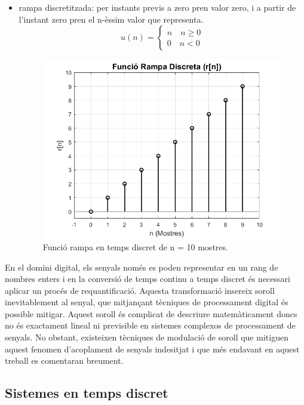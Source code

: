 \begin{itemize}
\begin{figure}[H]
        \label{step_fig}
    \end{figure}
    \item rampa discretitzada: per instants previs a zero pren valor zero, i a partir de l'instant zero pren el n-èssim valor que representa.
    \begin{equation}\label{ramp_func}
        u(n) = \left\lbrace\begin{array}{c} n\quad n \geq 0 \\ 0\quad n < 0 \end{array}\right.
    \end{equation}
    \begin{figure}[H]
        \centering
        \includegraphics[width=0.5\linewidth]{Images/imatge_rampa.png}
        \caption{Funció rampa en temps discret de n = 10 mostres.}
        \label{ramp_fig}
    \end{figure}    
\end{itemize}

\par En el domini digital, els senyals només es poden representar en un rang de nombres enters i en la conversió de temps continu a temps discret és necessari aplicar un procés de requantificació. Aquesta transformació insereix soroll inevitablement al senyal, que mitjançant tècniques de processament digital és possible mitigar. Aquest soroll és complicat de descriure matemàticament doncs no és exactament lineal ni previsible en sistemes complexos de processament de senyals. No obstant, existeixen tècniques de modulació de soroll que mitiguen aquest fenomen d'acoplament de senyals indesitjat i que més endavant en aquest treball es comentaran breument.
\subsection{Sistemes en temps discret}
